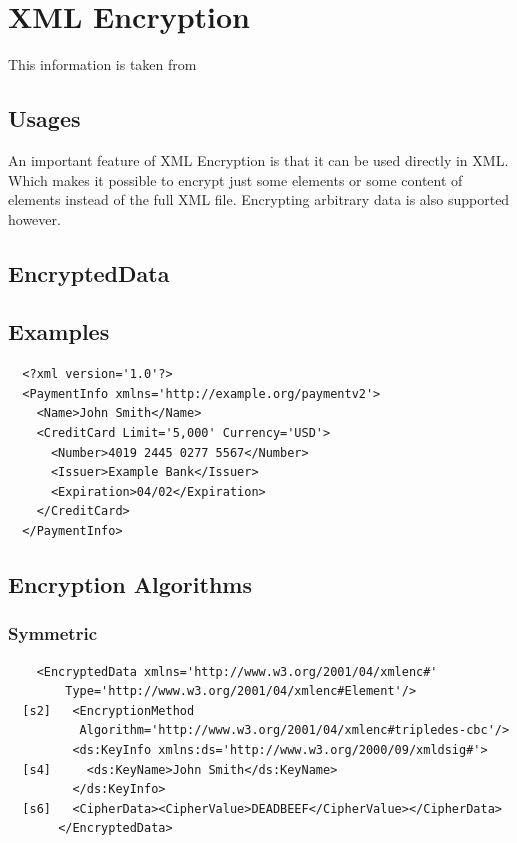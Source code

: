 \section{XML Encryption}
This information is taken from~\cite{w3c_xml_encryption}
\subsection{Usages}
An important feature of XML Encryption is that it can be used directly in XML\@.
Which makes it possible to encrypt just some elements or some content of
elements instead of the full XML file. Encrypting arbitrary data is also
supported however.
\subsection{EncryptedData}
\subsection{Examples}
\begin{verbatim}
  <?xml version='1.0'?>
  <PaymentInfo xmlns='http://example.org/paymentv2'>
    <Name>John Smith</Name>
    <CreditCard Limit='5,000' Currency='USD'>
      <Number>4019 2445 0277 5567</Number>
      <Issuer>Example Bank</Issuer>
      <Expiration>04/02</Expiration>
    </CreditCard>
  </PaymentInfo>
\end{verbatim}
\subsection{Encryption Algorithms}
\subsubsection{Symmetric}
\begin{verbatim}
    <EncryptedData xmlns='http://www.w3.org/2001/04/xmlenc#'
        Type='http://www.w3.org/2001/04/xmlenc#Element'/>
  [s2]   <EncryptionMethod
          Algorithm='http://www.w3.org/2001/04/xmlenc#tripledes-cbc'/>
         <ds:KeyInfo xmlns:ds='http://www.w3.org/2000/09/xmldsig#'>
  [s4]     <ds:KeyName>John Smith</ds:KeyName>
         </ds:KeyInfo>
  [s6]   <CipherData><CipherValue>DEADBEEF</CipherValue></CipherData>
       </EncryptedData>
\end{verbatim}

